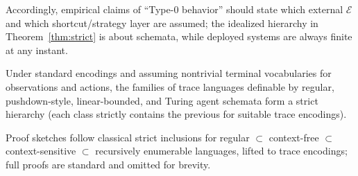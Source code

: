 \begin{remark}
Accordingly, empirical claims of ``Type-0 behavior'' should state which external $\mathcal{E}$ and which shortcut/strategy layer are assumed; the idealized hierarchy in Theorem~\ref{thm:strict} is about schemata, while deployed systems are always finite at any instant.
\end{remark}

\begin{theorem}
\label{thm:strict}
Under standard encodings and assuming nontrivial terminal vocabularies for observations and actions, the families of trace languages definable by regular, pushdown-style, linear-bounded, and Turing agent schemata form a strict hierarchy (each class strictly contains the previous for suitable trace encodings).
\end{theorem}

\begin{remark}
Proof sketches follow classical strict inclusions for regular $\subset$ context-free $\subset$ context-sensitive $\subset$ recursively enumerable languages, lifted to trace encodings; full proofs are standard and omitted for brevity.
\end{remark}
